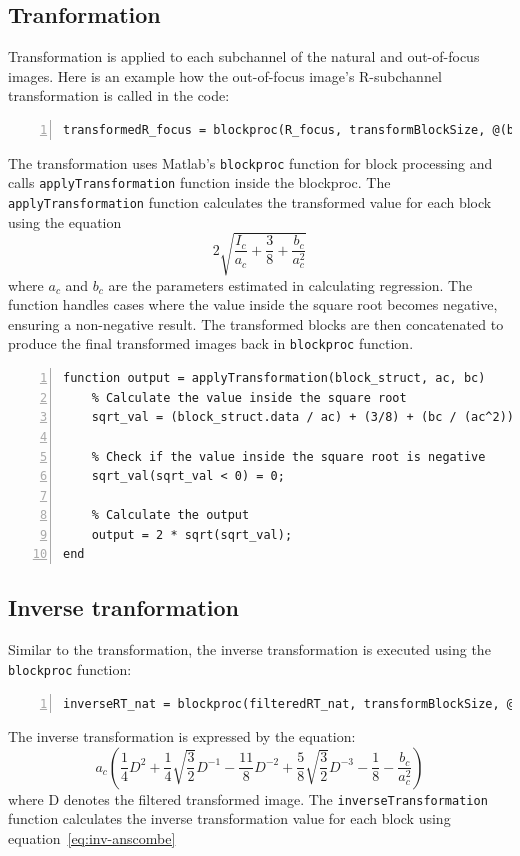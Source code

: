 \documentclass[12pt,a4paper,english
]{tunithesis}
\begin{document}
\subsection{Tranformation}
Transformation is applied to each subchannel of the natural and out-of-focus images. 
 Here is an example how the out-of-focus image's R-subchannel transformation is called in the code:
 \begin{lstlisting}[style=Matlab-editor, numbers=left, basicstyle=\footnotesize]
 transformedR_focus = blockproc(R_focus, transformBlockSize, @(block_struct) applyTransformation(block_struct, pR_focus(1), pR_focus(2)));
\end{lstlisting}
The transformation uses Matlab's \texttt{blockproc} function for block processing and calls \texttt{applyTransformation} function inside the blockproc. The \texttt{applyTransformation} function calculates the transformed value for each block using the equation
\begin{equation}
\label{eq:anscombe}
  2 \sqrt{\frac{I_{c}}{a_{c}} + \frac{3}{8} + \frac{b_{c}}{a_{c}^2}}
\end{equation}
 where $a_c$ and $b_c$ are the parameters estimated in calculating regression. The function handles cases where the value inside the square root becomes negative, ensuring a non-negative result. The transformed blocks are then concatenated to produce the final transformed images back in \texttt{blockproc} function.

\begin{lstlisting}[style=Matlab-editor, numbers=left, basicstyle=\footnotesize]
% 6. Transformation
function output = applyTransformation(block_struct, ac, bc)
    % Calculate the value inside the square root
    sqrt_val = (block_struct.data / ac) + (3/8) + (bc / (ac^2));

    % Check if the value inside the square root is negative
    sqrt_val(sqrt_val < 0) = 0;

    % Calculate the output
    output = 2 * sqrt(sqrt_val);
end
\end{lstlisting}
\subsection{Inverse tranformation}
Similar to the transformation, the inverse transformation is executed using the \texttt{blockproc} function:
\begin{lstlisting}[style=Matlab-editor, numbers=left, basicstyle=\footnotesize]
inverseRT_nat = blockproc(filteredRT_nat, transformBlockSize, @(block_struct) inverseTransformation(block_struct, pR_nat(1), pR_nat(2)));
\end{lstlisting}
The inverse transformation is expressed by the equation:
\begin{equation}
\label{eq:inv-anscombe}
a_c \left( \frac{1}{4} D^2 + \frac{1}{4}\sqrt{\frac{3}{2}}D^{-1} - \frac{11}{8}D^{-2} + \frac{5}{8}\sqrt{\frac{3}{2}}D^{-3} - \frac{1}{8} - \frac{b_c}{a_c^2} \right)
\end{equation}
where D denotes the filtered transformed image. The  \texttt{inverseTransformation} function calculates the inverse transformation value for each block using equation~\ref{eq:inv-anscombe}
\end{document}

